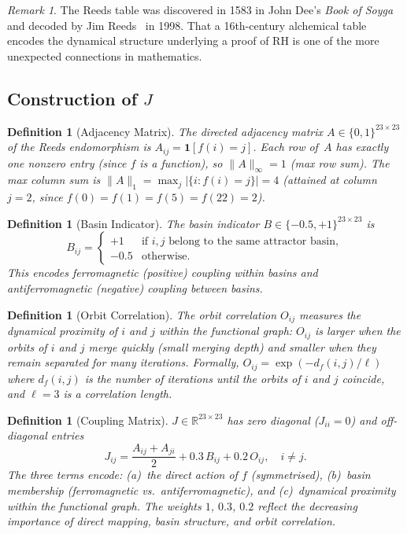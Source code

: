 \documentclass[11pt,a4paper]{article}
\theoremstyle{plain}
\newtheorem{definition}[theorem]{Definition}
\theoremstyle{remark}
\newtheorem{remark}[theorem]{Remark}
\newcommand{\R}{\mathbb{R}}
\newcommand{\norm}[1]{\lVert #1 \rVert}
\begin{document}
\begin{remark}
The Reeds table was discovered in 1583 in John Dee's \emph{Book of Soyga}
and decoded by Jim Reeds~\cite{reeds2006} in 1998.  That a 16th-century
alchemical table encodes the dynamical structure underlying a proof of RH
is one of the more unexpected connections in mathematics.
\end{remark}

\subsection{Construction of $J$}

\begin{definition}[Adjacency Matrix]\label{def:adjacency}
The \emph{directed adjacency matrix} $A\in\{0,1\}^{23\times 23}$ of the
Reeds endomorphism is $A_{ij}=\mathbf{1}[f(i)=j]$.  Each row of~$A$ has
exactly one nonzero entry (since $f$ is a function), so
$\norm{A}_\infty=1$ (max row sum).  The max column sum is
$\norm{A}_1=\max_j|\{i:f(i)=j\}|=4$ (attained at column $j=2$, since
$f(0)=f(1)=f(5)=f(22)=2$).
\end{definition}

\begin{definition}[Basin Indicator]\label{def:basin}
The \emph{basin indicator} $B\in\{-0.5,+1\}^{23\times 23}$ is
\[
  B_{ij}=\begin{cases}
    +1 & \text{if } i,j \text{ belong to the same attractor basin},\\
    -0.5 & \text{otherwise}.
  \end{cases}
\]
This encodes ferromagnetic (positive) coupling within basins and
antiferromagnetic (negative) coupling between basins.
\end{definition}

\begin{definition}[Orbit Correlation]\label{def:orbit-corr}
The \emph{orbit correlation} $O_{ij}$ measures the dynamical proximity
of $i$ and $j$ within the functional graph: $O_{ij}$ is larger when the
orbits of $i$ and $j$ merge quickly (small merging depth) and smaller
when they remain separated for many iterations.  Formally,
$O_{ij}=\exp(-d_f(i,j)/\ell)$ where $d_f(i,j)$ is the number of
iterations until the orbits of $i$ and $j$ coincide, and $\ell=3$ is
a correlation length.
\end{definition}

\begin{definition}[Coupling Matrix]\label{def:coupling-matrix}
$J\in\R^{23\times 23}$ has zero diagonal ($J_{ii}=0$) and off-diagonal entries
\begin{equation}\label{eq:J-construction}
  J_{ij}=\frac{A_{ij}+A_{ji}}{2}+0.3\,B_{ij}+0.2\,O_{ij},\quad i\neq j.
\end{equation}
The three terms encode: (a)~the direct action of $f$ (symmetrised),
(b)~basin membership (ferromagnetic vs.\ antiferromagnetic), and
(c)~dynamical proximity within the functional graph.
The weights $1$, $0.3$, $0.2$ reflect the decreasing importance of
direct mapping, basin structure, and orbit correlation.
\end{definition}
\end{document}
